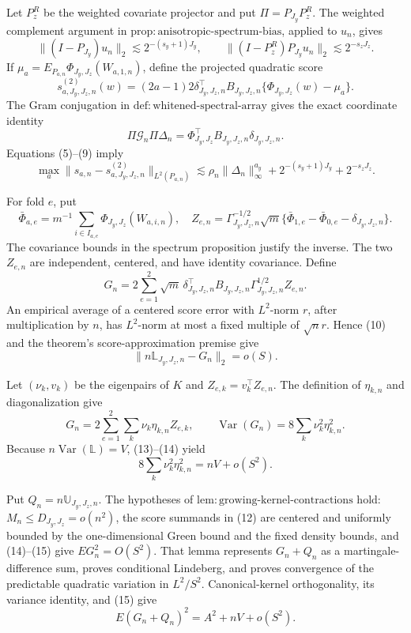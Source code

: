 Let \(P_z^R\) be the weighted covariate projector and put \(\Pi=P_{J_y}P_z^R\). The weighted complement argument in \(\mathrm{prop{:}anisotropic\text{-}spectrum\text{-}bias}\), applied to \(u_n\), gives
\[
\|(I-P_{J_y})u_n\|_2\lesssim2^{-(s_y+1)J_y},
\qquad
\|(I-P_z^R)P_{J_y}u_n\|_2\lesssim2^{-s_zJ_z}.                  \tag{8}
\]
If \(\mu_a=E_{P_{a,n}}\Phi_{J_y,J_z}(W_{a,1,n})\), define the projected quadratic score
\[
s^{(2)}_{a,J_y,J_z,n}(w)
=(2a-1)2\delta_{J_y,J_z,n}^{\top}B_{J_y,J_z,n}
\{\Phi_{J_y,J_z}(w)-\mu_a\}.
\]
The Gram conjugation in \(\mathrm{def{:}whitened\text{-}spectral\text{-}array}\) gives the exact coordinate identity
\[
\Pi\mathcal G_n\Pi\Delta_n
=\Phi_{J_y,J_z}^{\top}B_{J_y,J_z,n}\delta_{J_y,J_z,n}.          \tag{9}
\]
Equations (5)--(9) imply
\[
\max_a\|s_{a,n}-s^{(2)}_{a,J_y,J_z,n}\|_{L^2(P_{a,n})}
\lesssim
\rho_n\|\Delta_n\|_\infty^{a_y}
+2^{-(s_y+1)J_y}+2^{-s_zJ_z}.                                   \tag{10}
\]

For fold \(e\), put
\[
\bar\Phi_{a,e}=m^{-1}\sum_{i\in I_{a,e}}\Phi_{J_y,J_z}(W_{a,i,n}),
\quad
Z_{e,n}=\Gamma_{J_y,J_z,n}^{-1/2}\sqrt m
\{\bar\Phi_{1,e}-\bar\Phi_{0,e}-\delta_{J_y,J_z,n}\}.         \tag{11}
\]
The covariance bounds in the spectrum proposition justify the inverse. The two \(Z_{e,n}\) are independent, centered, and have identity covariance. Define
\[
G_n=2\sum_{e=1}^2\sqrt m\,
\delta_{J_y,J_z,n}^{\top}B_{J_y,J_z,n}
\Gamma_{J_y,J_z,n}^{1/2}Z_{e,n}.                                \tag{12}
\]
An empirical average of a centered score error with \(L^2\)-norm \(r\), after multiplication by \(n\), has \(L^2\)-norm at most a fixed multiple of \(\sqrt n r\). Hence (10) and the theorem's score-approximation premise give
\[
\|n\mathbb L_{J_y,J_z,n}-G_n\|_2=o(S).                         \tag{13}
\]

Let \((\nu_k,v_k)\) be the eigenpairs of \(K\) and \(Z_{e,k}=v_k^\top Z_{e,n}\). The definition of \(\eta_{k,n}\) and diagonalization give
\[
G_n=2\sum_{e=1}^2\sum_k\nu_k\eta_{k,n}Z_{e,k},
\qquad
\operatorname{Var}(G_n)=8\sum_k\nu_k^2\eta_{k,n}^2.           \tag{14}
\]
Because \(n\operatorname{Var}(\mathbb L)=V\), (13)--(14) yield
\[
8\sum_k\nu_k^2\eta_{k,n}^2=nV+o(S^2).                         \tag{15}
\]

Put \(Q_n=n\mathbb U_{J_y,J_z,n}\). The hypotheses of \(\mathrm{lem{:}growing\text{-}kernel\text{-}contractions}\) hold: \(M_n\le D_{J_y,J_z}=o(n^2)\), the score summands in (12) are centered and uniformly bounded by the one-dimensional Green bound and the fixed density bounds, and (14)--(15) give \(EG_n^2=O(S^2)\). That lemma represents \(G_n+Q_n\) as a martingale-difference sum, proves conditional Lindeberg, and proves convergence of the predictable quadratic variation in \(L^2/S^2\). Canonical-kernel orthogonality, its variance identity, and (15) give
\[
E(G_n+Q_n)^2=A^2+nV+o(S^2).                                    \tag{16}
\]

